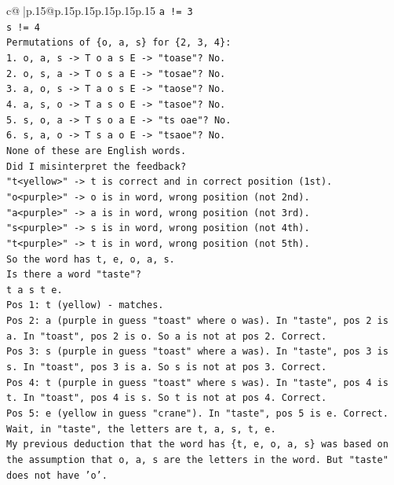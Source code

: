 \documentclass{article}
\begin{document}
{\begin{supertabular}{c@{$\;$}|p{.15\linewidth}@{}p{.15\linewidth}p{.15\linewidth}p{.15\linewidth}p{.15\linewidth}p{.15\linewidth}}
{{{\texttt{a != 3} \\
\texttt{s != 4} \\
\texttt{Permutations of \{o, a, s\} for \{2, 3, 4\}:} \\
\texttt{1. o, a, s {-}> T o a s E {-}> "toase"? No.} \\
\texttt{2. o, s, a {-}> T o s a E {-}> "tosae"? No.} \\
\texttt{3. a, o, s {-}> T a o s E {-}> "taose"? No.} \\
\texttt{4. a, s, o {-}> T a s o E {-}> "tasoe"? No.} \\
\texttt{5. s, o, a {-}> T s o a E {-}> "ts oae"? No.} \\
\texttt{6. s, a, o {-}> T s a o E {-}> "tsaoe"? No.} \\
\texttt{None of these are English words.} \\
\texttt{Did I misinterpret the feedback?} \\
\texttt{"t<yellow>" {-}> t is correct and in correct position (1st).} \\
\texttt{"o<purple>" {-}> o is in word, wrong position (not 2nd).} \\
\texttt{"a<purple>" {-}> a is in word, wrong position (not 3rd).} \\
\texttt{"s<purple>" {-}> s is in word, wrong position (not 4th).} \\
\texttt{"t<purple>" {-}> t is in word, wrong position (not 5th).} \\
\texttt{So the word has t, e, o, a, s.} \\
\texttt{Is there a word "taste"?} \\
\texttt{t a s t e.} \\
\texttt{Pos 1: t (yellow) {-} matches.} \\
\texttt{Pos 2: a (purple in guess "toast" where o was). In "taste", pos 2 is a. In "toast", pos 2 is o. So a is not at pos 2. Correct.} \\
\texttt{Pos 3: s (purple in guess "toast" where a was). In "taste", pos 3 is s. In "toast", pos 3 is a. So s is not at pos 3. Correct.} \\
\texttt{Pos 4: t (purple in guess "toast" where s was). In "taste", pos 4 is t. In "toast", pos 4 is s. So t is not at pos 4. Correct.} \\
\texttt{Pos 5: e (yellow in guess "crane"). In "taste", pos 5 is e. Correct.} \\
\texttt{Wait, in "taste", the letters are t, a, s, t, e.} \\
\texttt{My previous deduction that the word has \{t, e, o, a, s\} was based on the assumption that o, a, s are the letters in the word. But "taste" does not have 'o'.} \\
}}}
\end{supertabular}}
\end{document}
